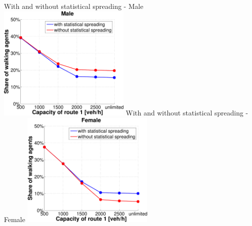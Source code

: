 {  \createsubfigure%
  {With and without statistical spreading - Male}%
  {\includegraphics[width=0.48\textwidth, angle=0, trim=0mm 0mm 0mm 9mm, clip=true]{extending/figures/MultiModalSimulation/simulations/WithAndWithoutMale}}%
  {\label{}}%
  {\hspace{3mm}}%
  \createsubfigure%
  {With and without statistical spreading - Female}%
  {\includegraphics[width=0.48\textwidth, angle=0, trim=0mm 0mm 0mm 9mm, clip=true]{extending/figures/MultiModalSimulation/simulations/WithAndWithoutFemale}}%
  {\label{}}%
  {}%
}%
{}


